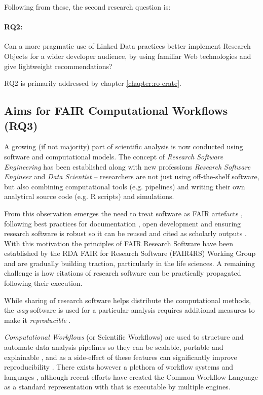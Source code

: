 Following from these, the second research question is: 

\paragraph{RQ2:}\label{rq2}  Can a more pragmatic use of Linked Data practices better implement Research Objects for a wider developer audience, by using familiar Web technologies and give lightweight recommendations?

RQ2 is primarily addressed by chapter \ref{chapter:ro-crate}.


\subsection{Aims for FAIR Computational Workflows (RQ3)}
\label{intro:rq3}

A growing (if not majority) part of scientific analysis is now conducted using software and computational models. The concept of \emph{Research Software Engineering} \cite{Cohen 2020} has been established along with new professions \emph{Research Software Engineer} \cite{Baxter 2012} and \emph{Data Scientist} \cite{van der Aalst 2014} -- researchers are not just using off-the-shelf software, but also combining computational tools (e.g. pipelines) and writing their own analytical source code (e.g. R scripts) and simulations.

From this observation emerges the need to treat software as FAIR artefacts \cite{Lamprecht 2019}, following best practices for documentation \cite{Lee 2018}, open development \cite{Prlić 2012} and ensuring research software is robust \cite{Taschuk 2017} so it can be reused and cited as scholarly outputs \cite{Smith 2016}. 
With this motivation the principles of FAIR Research Software \cite{Katz 2021b} have been established by the RDA FAIR for Research Software (FAIR4RS) Working Group \cite{Barker 2022} and are gradually building traction, particularly in the life sciences. A remaining challenge is how citations of research software can be practically propagated following their execution. 

While sharing of research software helps distribute the computational methods, the \emph{way} software is used for a particular analysis requires additional measures to make it \emph{reproducible} \cite{Stodden 2016,ch5-101}.

\emph{Computational Workflows} (or Scientific Workflows) are used to structure and automate data analysis pipelines so they can be scalable, portable and explainable \cite{Atkinson 2017}, and as a side-effect of these features can significantly improve reproducibility \cite{Cohen-Boulakia 2017}. 
There exists however a plethora of workflow systems and languages \cite{Leipzig 2021,ch8-43}, although recent efforts have created the Common Workflow Language \cite{Crusoe 2022} as a standard representation with  that is executable by multiple engines. 


